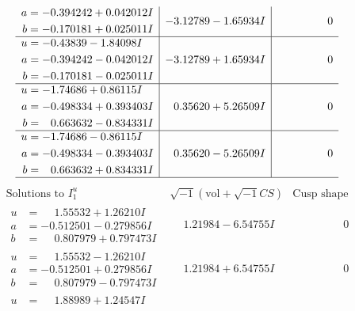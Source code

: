 \documentclass[1p]{elsarticle_modified}
\theoremstyle{definition}
\newcommand{\I}{\sqrt{-1}}
\begin{document}
$$\begin{array}{c|c|c}
\begin{aligned}
a &= -0.394242 + 0.042012 I \\
b &= -0.170181 + 0.025011 I\end{aligned}
 & -3.12789 - 1.65934 I & \phantom{-0.000000 } 0 \\ \hline\begin{aligned}
u &= -0.43839 - 1.84098 I \\
a &= -0.394242 - 0.042012 I \\
b &= -0.170181 - 0.025011 I\end{aligned}
 & -3.12789 + 1.65934 I & \phantom{-0.000000 } 0 \\ \hline\begin{aligned}
u &= -1.74686 + 0.86115 I \\
a &= -0.498334 + 0.393403 I \\
b &= \phantom{-}0.663632 - 0.834331 I\end{aligned}
 & \phantom{-}0.35620 + 5.26509 I & \phantom{-0.000000 } 0 \\ \hline\begin{aligned}
u &= -1.74686 - 0.86115 I \\
a &= -0.498334 - 0.393403 I \\
b &= \phantom{-}0.663632 + 0.834331 I\end{aligned}
 & \phantom{-}0.35620 - 5.26509 I & \phantom{-0.000000 } 0\\
 \hline 
 \end{array}$$\newpage$$\begin{array}{c|c|c}  
\text{Solutions to }I^u_{1}& \I (\text{vol} + \sqrt{-1}CS) & \text{Cusp shape}\\
 \hline 
\begin{aligned}
u &= \phantom{-}1.55532 + 1.26210 I \\
a &= -0.512501 - 0.279856 I \\
b &= \phantom{-}0.807979 + 0.797473 I\end{aligned}
 & \phantom{-}1.21984 - 6.54755 I & \phantom{-0.000000 } 0 \\ \hline\begin{aligned}
u &= \phantom{-}1.55532 - 1.26210 I \\
a &= -0.512501 + 0.279856 I \\
b &= \phantom{-}0.807979 - 0.797473 I\end{aligned}
 & \phantom{-}1.21984 + 6.54755 I & \phantom{-0.000000 } 0 \\ \hline\begin{aligned}
u &= \phantom{-}1.88989 + 1.24547 I \\

\end{aligned}
\end{array}$$
\end{document}
